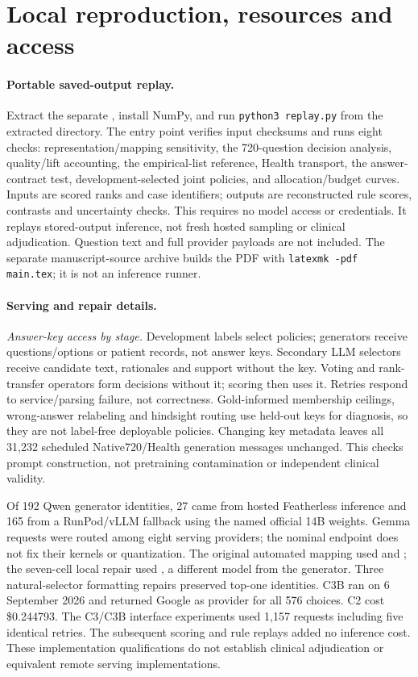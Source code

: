\section{Local reproduction, resources and access}\label{app:repro}

\paragraph{Portable saved-output replay.}
Extract the separate , install NumPy, and run \texttt{python3 replay.py} from the extracted directory. The entry point verifies input checksums and runs eight checks: representation/mapping sensitivity, the 720-question decision analysis, quality/lift accounting, the empirical-list reference, Health transport, the answer-contract test, development-selected joint policies, and allocation/budget curves. Inputs are scored ranks and case identifiers; outputs are reconstructed rule scores, contrasts and uncertainty checks. This requires no model access or credentials. It replays stored-output inference, not fresh hosted sampling or clinical adjudication. Question text and full provider payloads are not included. The separate manuscript-source archive builds the PDF with \texttt{latexmk -pdf main.tex}; it is not an inference runner.

\paragraph{Serving and repair details.}
\textit{Answer-key access by stage.} Development labels select policies; generators receive questions/options or patient records, not answer keys. Secondary LLM selectors receive candidate text, rationales and support without the key. Voting and rank-transfer operators form decisions without it; scoring then uses it. Retries respond to service/parsing failure, not correctness. Gold-informed membership ceilings, wrong-answer relabeling and hindsight routing use held-out keys for diagnosis, so they are not label-free deployable policies. Changing key metadata leaves all 31,232 scheduled Native720/Health generation messages unchanged. This checks prompt construction, not pretraining contamination or independent clinical validity.

Of 192 Qwen generator identities, 27 came from hosted Featherless inference and 165 from a RunPod/vLLM fallback using the named official 14B weights. Gemma requests were routed among eight serving providers; the nominal endpoint does not fix their kernels or quantization. The original automated mapping used  and ; the seven-cell local repair used , a different model from the generator. Three natural-selector formatting repairs preserved top-one identities. C3B ran on 6 September 2026 and returned Google as provider for all 576 choices. C2 cost \$0.244793. The C3/C3B interface experiments used 1,157 requests including five identical retries. The subsequent scoring and rule replays added no inference cost. These implementation qualifications do not establish clinical adjudication or equivalent remote serving implementations.

